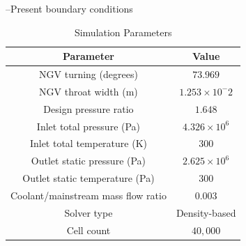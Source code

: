 \documentclass[a4paper, 11pt, twoside]{report}
\begin{document}
--Present boundary conditions
\begin{table}[H]
\caption{Simulation Parameters}
\label{SCH_parameters}
\begin{center}
\begin{tabular}{|c|c|}
\hline
Parameter & Value\\
\hline
NGV turning (degrees) & $73.969$\\
NGV throat width (m) & $1.253 \times 10^-2$\\
Design pressure ratio & $1.648$\\
Inlet total pressure (Pa) & $4.326 \times 10^6$\\
Inlet total temperature (K) & $300$\\
Outlet static pressure (Pa) & $2.625 \times 10^6$\\
Outlet static temperature (Pa) & $300$\\
Coolant/mainstream mass flow ratio & $0.003$\\
Solver type & Density-based\\
Cell count & $40,000$\\
\hline
\end{tabular}
\end{center}
\end{table}
\end{document}
